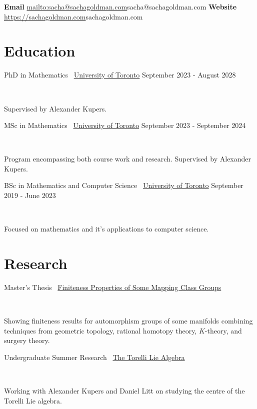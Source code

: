 \documentclass[]{style}
\begin{document}

\vspace{-5mm}
\begin{center}
	\textbf{Email}
	\url{mailto:sacha@sachagoldman.com}{sacha@sachagoldman.com} \hspace{1cm}
	\textbf{Website} 
	\url{https://sachagoldman.com}{sachagoldman.com}
\end{center}
\vspace{5mm}
 
\section{Education}

\begin{entrylist}

\vspace{1mm}

\entry
{PhD in Mathematics \ {\normalfont \underline{University of Toronto}}}
{September 2023 - August 2028}
{  ~ \vspace{-2.5mm}

Supervised by Alexander Kupers.
}

\entry
{MSc in Mathematics \ {\normalfont \underline{University of Toronto}}}
{September 2023 - September 2024}
{  ~ \vspace{-2.5mm}

Program encompassing both course work and research. Supervised by Alexander Kupers.
}

\entry
{BSc in Mathematics and Computer Science \ {\normalfont \underline{University of Toronto}}}
{September 2019 - June 2023}
{ ~ \vspace{-2.5mm}

Focused on mathematics and it's applications to computer science.
}

\end{entrylist}

\section{Research}

\begin{entrylist}

\vspace{1mm}

\entry
{Master's Thesis \ {\normalfont \underline{Finiteness Properties of Some Mapping Class Groups}}}
{}
{ ~ \vspace{-2.5mm}

Showing finiteness results for automorphism groups of some manifolds combining techniques from geometric topology, rational homotopy theory, $K$-theory, and surgery theory.}

\entry
{Undergraduate Summer Research \ {\normalfont \underline{The Torelli Lie Algebra}}}
{}
{ ~ \vspace{-2.5mm}

Working with Alexander Kupers and Daniel Litt on studying the centre of the Torelli Lie algebra.}

\end{entrylist}
\end{document}
